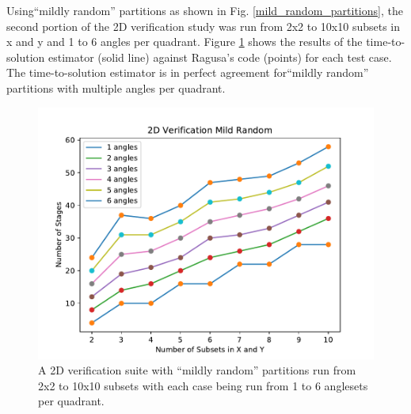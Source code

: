 Using``mildly random'' partitions as shown in Fig. \ref{mild_random_partitions}, the second portion of the 2D verification study was run from 2x2 to 10x10 subsets in x and y and 1 to 6 angles per quadrant.  Figure \ref{mild_random_verification} shows the results of the time-to-solution estimator (solid line) against Ragusa's code (points) for each test case. The time-to-solution estimator is in perfect agreement for``mildly random'' partitions with multiple angles per quadrant.

\begin{figure}[H]
\centering
\includegraphics[scale=0.8]{../figures/mild_random_verification.pdf}
\caption{A 2D verification suite with ``mildly random'' partitions run from 2x2 to 10x10 subsets with each case being run from 1 to 6 anglesets per quadrant.}
\label{mild_random_verification}
\end{figure}


